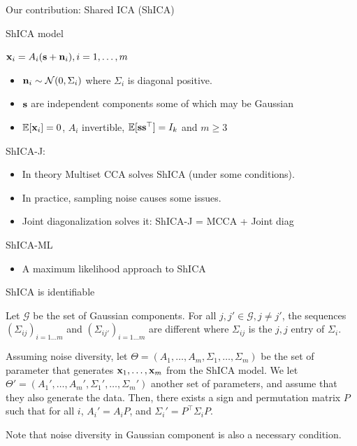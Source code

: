 \documentclass[bigger]{beamer}
\begin{document}
\begin{frame}{Our contribution: Shared ICA (ShICA)}
  \begin{block}{ShICA model}
     \begin{center}$ \mathbf{x}_i = A_i (\mathbf{s} + \mathbf{n}_i), i=1,\dots, m$ \end{center}
    \begin{itemize}
      \item $\mathbf{n}_i \sim \mathcal{N}(0, \Sigma_i)$ where $\Sigma_i$ is diagonal positive.
      \item $\mathbf{s}$ are independent components some of which may be Gaussian
      \item $\mathbb{E}[\mathbf{x}_i] = 0$, $A_i$ invertible, $\mathbb{E}[\mathbf{s} \mathbf{s}^{\top}] = I_k$ and $m \geq 3$
     \end{itemize}
  \end{block}
  \begin{block}{ShICA-J: }
    \begin{itemize}
\item In theory Multiset CCA solves ShICA (under some conditions).
\item In practice, sampling noise causes some issues.
\item Joint diagonalization solves it: ShICA-J = MCCA + Joint diag
  \end{itemize}
  \end{block}
  \begin{block}{ShICA-ML}

    \begin{itemize}
  \item A maximum likelihood approach to ShICA
    \end{itemize}
  \end{block}
\end{frame}

\begin{frame}{ShICA is identifiable}
  \begin{definition}
    Let $\mathcal{G}$ be the set of Gaussian components. For all $j, j'  \in \mathcal{G}, j \neq j'$, the sequences $(\Sigma_{ij})_{i=1 \dots m}$ and $(\Sigma_{ij'})_{i=1 \dots m}$ are different where $\Sigma_{ij}$ is the $j, j$ entry of $\Sigma_i$.
  \end{definition}
\begin{theorem}[Identifiability]
  Assuming noise diversity, let $\Theta=(A_1, \dots, A_m, \Sigma_1, \dots,\Sigma_m)$ be the set of
  parameter that generates $\mathbf{x}_1 ,\dots, \mathbf{x}_m$ from the ShICA model. 
  We let $\Theta'=(A_1', \dots, A_m', \Sigma_1', \dots,\Sigma_m')$ another set
  of parameters, and assume that they also generate the data. Then, there exists a sign and permutation matrix $P$ such that for all $i$, $A_i'=A_iP$, and $\Sigma_i'= P^{\top} \Sigma_i P$.
\end{theorem}
Note that noise diversity in Gaussian component is also a necessary condition.
\end{frame}
\end{document}
